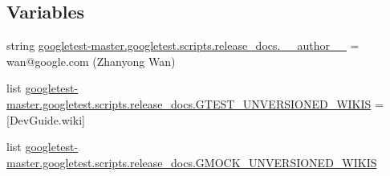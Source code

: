\subsection*{Variables}
\begin{DoxyCompactItemize}
\item 
string \mbox{\hyperlink{namespacegoogletest-master_1_1googletest_1_1scripts_1_1release__docs_a9e02120e61a5b4776366571e4cf6223a}{googletest-\/master.\+googletest.\+scripts.\+release\+\_\+docs.\+\_\+\+\_\+author\+\_\+\+\_\+}} = \textquotesingle{}wan@google.\+com (Zhanyong Wan)\textquotesingle{}
\item 
list \mbox{\hyperlink{namespacegoogletest-master_1_1googletest_1_1scripts_1_1release__docs_a0bfd729098eeeba574aee699b6c0536e}{googletest-\/master.\+googletest.\+scripts.\+release\+\_\+docs.\+G\+T\+E\+S\+T\+\_\+\+U\+N\+V\+E\+R\+S\+I\+O\+N\+E\+D\+\_\+\+W\+I\+K\+IS}} = \mbox{[}\textquotesingle{}Dev\+Guide.\+wiki\textquotesingle{}\mbox{]}
\item 
list \mbox{\hyperlink{namespacegoogletest-master_1_1googletest_1_1scripts_1_1release__docs_a05ee9e0e6a3c10d9d808597d60d324cf}{googletest-\/master.\+googletest.\+scripts.\+release\+\_\+docs.\+G\+M\+O\+C\+K\+\_\+\+U\+N\+V\+E\+R\+S\+I\+O\+N\+E\+D\+\_\+\+W\+I\+K\+IS}}
\end{DoxyCompactItemize}
